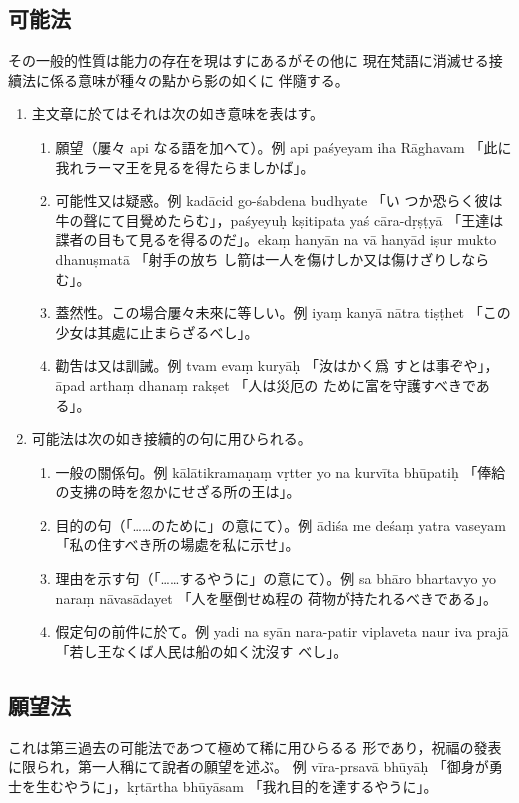 \subsection{可能法}
\numberParagraph
その一般的性質は能力の存在を現はすにあるがその他に
現在梵語に消滅せる接續法に係る意味が種々の點から影の如くに
伴隨する。
\begin{enumerate}[label=(\arabic*)]
\item 主文章に於てはそれは次の如き意味を表はす。
\begin{enumerate}[label=(\alph*)]
\item 願望（屢々 api なる語を加へて）。例 api paśyeyam iha
Rāghavam 「此に我れラーマ王を見るを得たらましかば」。
\item 可能性又は疑惑。例 kadācid go-śabdena budhyate 「い
つか恐らく彼は牛の聲にて目覺めたらむ」，paśyeyuḥ kṣitipata\-%
yaś cāra-dṛṣṭyā 「王達は諜者の目もて見るを得るのだ」。ekaṃ
hanyān na vā hanyād iṣur mukto dhanuṣmatā 「射手の放ち
し箭は一人を傷けしか又は傷けざりしならむ」。
\item 蓋然性。この場合屢々未來に等しい。例 iyaṃ kanyā
nātra tiṣṭhet 「この少女は其處に止まらざるべし」。
\item 勸吿は又は訓誡。例 tvam evaṃ kuryāḥ 「汝はかく爲
すとは事ぞや」，āpad arthaṃ dhanaṃ rakṣet 「人は災厄の
ために富を守護すべきである」。
\end{enumerate}
\item 可能法は次の如き接續的の句に用ひられる。
\begin{enumerate}[label=(\alph*)]
\item 一般の關係句。例 kālātikramaṇaṃ vṛtter yo na
kurvīta bhūpatiḥ 「俸給の支拂の時を忽かにせざる所の王は」。
\item 目的の句（「……のために」の意にて）。例 ādiśa me
deśaṃ yatra vaseyam 「私の住すべき所の場處を私に示せ」。
\item 理由を示す句（「……するやうに」の意にて）。例 sa
bhāro bhartavyo yo naraṃ nāvasādayet 「人を壓倒せぬ程の
荷物が持たれるべきである」。
\item 假定句の前件に於て。例 yadi na syān nara-patir
viplaveta naur iva prajā 「若し王なくば人民は船の如く沈沒す
べし」。
\end{enumerate}
\end{enumerate}

\subsection{願望法}
\numberParagraph
これは第三過去の可能法であつて極めて稀に用ひらるる
形であり，祝福の發表に限られ，第一人稱にて說者の願望を述ぶ。
例 vīra-prsavā bhūyāḥ 「御身が勇士を生むやうに」，kṛtārtha
bhūyāsam 「我れ目的を達するやうに」。

